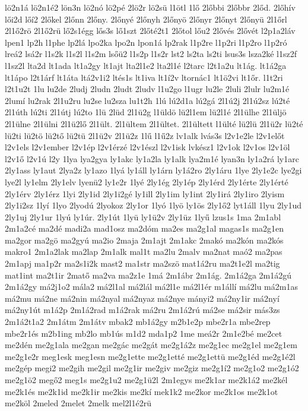 {lö2n1á
lö2n1é2
lön3n
lö2nó
lö2pé
2lö2r
lö2sü
l1ötl
1lő
2lőbbi
2lőbbr
2lőd.
2lőhív
lői2d
lőí2
2lőkel
2lőnn
2lőny.
2lőnyé
2lőnyh
2lőnyö
2lőnyr
2lőnyt
2lőnyü
2l1őrl
2l1ő2rö
2l1ő2rü
lő2s1égg
lős3s
lő1szt
2lőté2t1
2lőtol
lőu2
2lővés
2lővét
l2p1a2láv
lpen1
lp2h
l1phe
lp2lá
lpo2ka
lpo2n
lpon1á
lp2rak
l1p2re
l1p2ri
l1p2ro
l1p2ró
lreá2
lsá2r
l1s2k
l1s2l
l1s2m
lsőü2
l1s2p
l1s2r
lst2
ls2ta
ls2ti
lsus3s
lsza2ké
l1sz2f
l1sz2l
lta2d
lt1ada
lt1a2gy
lt1ajt
lta2l1e2
lta2l1é
l2tarc
l2t1a2u
lt1ág.
lt1á2ga
lt1ápo
l2t1árf
lt1áta
ltá2v1i2
ltés1s
lt1iva
lt1í2v
ltornác1
lt1ö2vi
lt1őr.
l1t2ri
l2t1u2t
1lu
lu2de
2ludj
2ludn
2ludt
2ludv
l1u2go
l1ugr
lu2le
2luli
2lulr
lu2m1é
2lumí
lu2rak
2l1u2ru
lu2se
lu2sza
lu1t2h
1lú
lú2d1a
lú2gá
2l1ú2j
2l1ú2sz
lú2té
2l1úth
lú2ti
2l1útj
lú2to
1lü
2lüd
2l1ü2g
l1üldö
lü2l1em
lü2l1é
2l1ülhe
2l1üljö
2l1ülne
2l1ülni
2l1ü2lő
2l1ült.
2l1ültem
2l1ültet.
2l1ültett
l1ülté
lü2lü
2l1ü2r
lü2té
lü2ti
lü2tö
lü2tő
lü2tü
2l1ü2v
2l1ü2z
1lű
l1ű2z
lv1alk
lvás3s
l2v1e2le
l2v1előt
l2v1els
l2v1ember
l2v1ép
l2v1érzé
l2v1észl
l2v1isk
lvkész1
l2v1ok
l2v1os
l2v1öl
l2v1ő
l2v1ú
l2y
1lya
lya2gya
ly1akc
ly1a2la
ly1alk
lya2m1é
lyan3n
ly1a2rá
ly1arc
2ly1ass
ly1aut
2lya2z
ly1azo
1lyá
ly1áll
ly1árn
ly1á2ro
2ly1áru
1lye
2ly1e2c
lye2gi
lye2l
ly1elm
2ly1elv
lyenü2
ly1e2r
1lyé
2ly1ég
2ly1ép
2ly1érd
2ly1érte
2ly1érté
2ly1érv
2ly1érz
1lyi
2ly1id
2ly1i2gé
ly1ill
2ly1im
ly1int
2ly1irá
2ly1iro
2lyism
2ly1i2sz
1lyí
1lyo
2lyodú
2lyokoz
2ly1or
1lyó
1lyö
ly1ös
2ly1ő2
lyt1áll
1lyu
2ly1ud
2ly1uj
2ly1ur
1lyú
ly1úr.
2ly1út
1lyü
ly1ü2v
2ly1üz
1lyű
lzus1s
1ma
2m1abl
2m1a2cé
ma2dé
madi2a
mad1osz
ma2dóm
ma2es
ma2g1al
magas1s
ma2g1en
ma2gor
ma2gö
ma2gyú
ma2io
2maja
2m1ajt
2m1akc
2makó
ma2kón
ma2kós
makro1
2m1a2lak
ma2lap
2m1alk
mal1t
ma2lu
2malv
ma2nat
maó2
ma2pas
2m1apj
ma1p2r
ma2s1i2k
mast2
ma1str
ma2szö
mat1á2ru
ma2t1e2l
ma2tig
mat1int
ma2t1ir
2matő
ma2va
ma2z1e
1má
2m1ábr
2m1ág.
2m1á2ga
2m1á2gú
2m1á2gy
má2j1o2
mála2
má2l1al
má2lál
má2l1e
má2l1ér
m1állí
má2lu
má2m1as
má2mu
má2ne
má2nin
má2nyal
má2nyaz
má2nye
mányi2
má2ny1ir
má2nyí
má2ny1út
m1á2p
2m1á2rad
m1á2rak
má2ru
2m1á2rú
má2se
má2sir
más3zs
2m1á2t1a2
2m1átm
2m1átv
mbak2
mb1á2gy
m2b1e2p
mbe2r1a
mbe2rep
mbe2r1és
m2b1ing
mb2lo
mb1ús
m1d2
mda1p2
1me
meá2r
2m1e2bé
me2cet
me2dén
me2g1ala
me2gan
me2gác
me2gát
me2g1á2z
me2g1ec
me2g1el
me2g1em
me2g1e2r
meg1esk
meg1esn
me2g1ette
me2g1etté
me2g1ettü
me2g1éd
me2g1é2l
me2gép
megi2
me2gih
me2gil
me2g1ir
me2giv
me2giz
me2g1í2
me2g1o2
me2g1ó2
me2g1ö2
megő2
meg1s
me2g1u2
me2g1ü2l
2m1egys
me2k1ar
me2k1á2
me2kél
me2k1és
me2k1id
me2k1ir
me2kis
me2kí
mek1k2
me2kor
me2k1os
me2k1ot
me2köl
2meled
2melet
2melk
mel2l1é2rü
}
